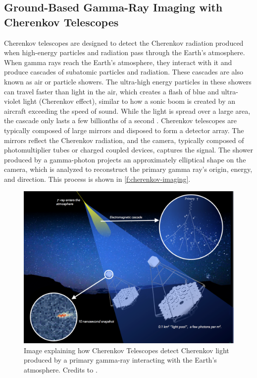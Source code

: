 \subsection{Ground-Based Gamma-Ray Imaging with Cherenkov Telescopes}
\label{ss:iact}
Cherenkov telescopes are designed to detect the Cherenkov radiation produced when high-energy particles and radiation pass through the Earth's atmosphere. 
When gamma rays reach the Earth's atmosphere, they interact with it and produce cascades of subatomic particles and radiation. These cascades are also known as air or particle showers. The ultra-high energy particles in these showers can travel faster than light in the air, which creates a flash of blue and ultra-violet light (Cherenkov effect), similar to how a sonic boom is created by an aircraft exceeding the speed of sound. While the light is spread over a large area, the cascade only lasts a few billionths of a second \cite{ong2009gamma}.  Cherenkov telescopes are typically composed of large mirrors and disposed to form a detector array. The mirrors reflect the Cherenkov radiation, and the camera, typically composed of photomultiplier tubes or charged coupled devices, captures the signal. The shower produced by a gamma-photon projects an approximately elliptical shape on the camera, which is analyzed to reconstruct the primary gamma ray's origin, energy, and direction. This process is shown in \autoref{f:cherenkov-imaging}.
\begin{figure}[ht] 
\centering
\includegraphics[width=1\textwidth]{figures/introduction/cherenkov-imaging.png}
\caption{Image explaining how Cherenkov Telescopes detect Cherenkov light produced by a primary gamma-ray interacting with the Earth’s atmosphere. Credits to \cite{ctaobservatorywebsite}.}
\label{f:cherenkov-imaging}
\end{figure}
